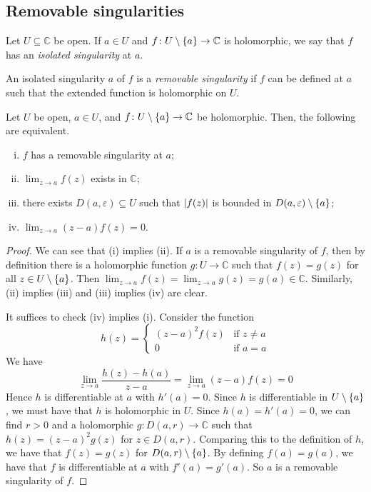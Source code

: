 \subsection{Removable singularities}
\begin{definition}
	Let \( U \subseteq \mathbb C \) be open.
	If \( a \in U \) and \( f \colon U \setminus \qty{a} \to \mathbb C \) is holomorphic, we say that \( f \) has an \textit{isolated singularity} at \( a \).
\end{definition}
\begin{definition}
	An isolated singularity \( a \) of \( f \) is a \textit{removable singularity} if \( f \) can be defined at \( a \) such that the extended function is holomorphic on \( U \).
\end{definition}
\begin{proposition}
	Let \( U \) be open, \( a \in U \), and \( f \colon U \setminus \qty{a} \to \mathbb C \) be holomorphic.
	Then, the following are equivalent.
	\begin{enumerate}[(i)]
		\item \( f \) has a removable singularity at \( a \);
		\item \( \lim_{z \to a} f(z) \) exists in \( \mathbb C \);
		\item there exists \( D(a,\varepsilon) \subseteq U \) such that \( \abs{f(z)} \) is bounded in \( D(a,\varepsilon) \setminus \qty{a} \);
		\item \( \lim_{z \to a} (z-a) f(z) = 0 \).
	\end{enumerate}
\end{proposition}
\begin{proof}
	We can see that (i) implies (ii).
	If \( a \) is a removable singularity of \( f \), then by definition there is a holomorphic function \( g \colon U \to \mathbb C \) such that \( f(z) = g(z) \) for all \( z \in U \setminus \qty{a} \).
	Then \( \lim_{z \to a} f(z) = \lim_{z \to a} g(z) = g(a) \in \mathbb C \).
	Similarly, (ii) implies (iii) and (iii) implies (iv) are clear.

	It suffices to check (iv) implies (i).
	Consider the function
	\[ h(z) = \begin{cases}
		(z-a)^2 f(z) & \text{if } z \neq a \\
		0 & \text{if } a = a
	\end{cases} \]
	We have
	\[ \lim_{z \to a} \frac{h(z) - h(a)}{z-a} = \lim_{z \to a} (z-a) f(z) = 0 \]
	Hence \( h \) is differentiable at \( a \) with \( h'(a) = 0 \).
	Since \( h \) is differentiable in \( U \setminus \qty{a} \), we must have that \( h \) is holomorphic in \( U \).
	Since \( h(a) = h'(a) = 0 \), we can find \( r > 0 \) and a holomorphic \( g \colon D(a,r) \to \mathbb C \) such that \( h(z) = (z-a)^2 g(z) \) for \( z \in D(a,r) \).
	Comparing this to the definition of \( h \), we have that \( f(z) = g(z) \) for \( D(a,r) \setminus \qty{a} \).
	By defining \( f(a) = g(a) \), we have that \( f \) is differentiable at \( a \) with \( f'(a) = g'(a) \).
	So \( a \) is a removable singularity of \( f \).
\end{proof}
